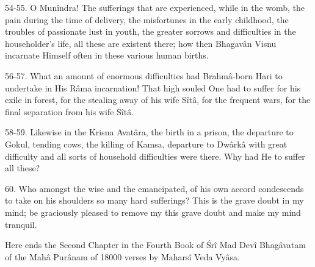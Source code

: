 54-55. O Mun\^indra! The sufferings that are experienced, while in the womb, the pain during the time of delivery, the misfortunes in the early childhood, the troubles of passionate lust in youth, the greater sorrows and difficulties in the householder's life, all these are existent there; how then Bhagav\^an Visnu incarnate Himself often in these various human births.

56-57. What an amount of enormous difficulties had Brahm\^a-born Hari to undertake in His R\^ama incarnation! That high souled One had to suffer for his exile in forest, for the stealing away of his wife S\^it\^a, for the frequent wars, for the final separation from his wife S\^it\^a.

58-59. Likewise in the Krisna Avat\^ara, the birth in a prison, the departure to Gokul, tending cows, the killing of Kamsa, departure to Dw\^ark\^a with great difficulty and all sorts of household difficulties were there. Why had He to suffer all these?

60. Who amongst the wise and the emancipated, of his own accord condescends to take on his shoulders so many hard sufferings? This is the grave doubt in my mind; be graciously pleased to remove my this grave doubt and make my mind tranquil.

Here ends the Second Chapter in the Fourth Book of \'Sr\^i Mad Dev\^i Bhag\^avatam of the Mah\^a Pur\^anam of 18000 verses by Mahars\^i Veda Vy\^asa.
